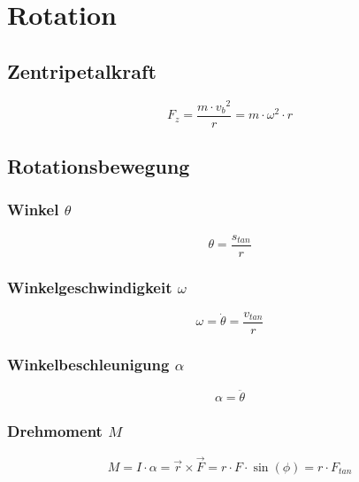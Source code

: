 



\chapter{Rotation}
\section{Zentripetalkraft}
\[ F_z = \frac{m \cdot {v_b}^2}{r} = m \cdot \omega^2 \cdot r \]

\section{Rotationsbewegung}

\subsection{Winkel $\theta$}
\[ \theta = \frac{s_{tan}}{r} \]

\subsection{Winkelgeschwindigkeit $\omega$}
\[ \omega = \dot{\theta} = \frac{v_{tan}}{r} \]

\subsection{Winkelbeschleunigung $\alpha$}
\[ \alpha = \ddot{\theta} \]

\subsection{Drehmoment $M$}
\[ M = I \cdot \alpha = \vec{r} \times \vec{F} = r \cdot F \cdot \sin(\phi) 
= r \cdot F_{tan} \]

